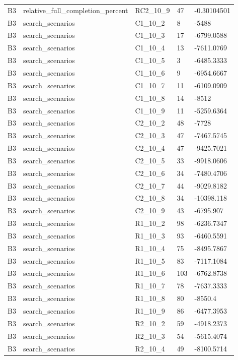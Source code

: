 \begin{longtable}{lllll}
B3 & relative\_full\_completion\_percent & RC2\_10\_9 & 47 & -0.30104501 \\
B3 & search\_scenarios & C1\_10\_2 & 8 & -5488 \\
B3 & search\_scenarios & C1\_10\_3 & 17 & -6799.0588 \\
B3 & search\_scenarios & C1\_10\_4 & 13 & -7611.0769 \\
B3 & search\_scenarios & C1\_10\_5 & 3 & -6485.3333 \\
B3 & search\_scenarios & C1\_10\_6 & 9 & -6954.6667 \\
B3 & search\_scenarios & C1\_10\_7 & 11 & -6109.0909 \\
B3 & search\_scenarios & C1\_10\_8 & 14 & -8512 \\
B3 & search\_scenarios & C1\_10\_9 & 11 & -5259.6364 \\
B3 & search\_scenarios & C2\_10\_2 & 48 & -7728 \\
B3 & search\_scenarios & C2\_10\_3 & 47 & -7467.5745 \\
B3 & search\_scenarios & C2\_10\_4 & 47 & -9425.7021 \\
B3 & search\_scenarios & C2\_10\_5 & 33 & -9918.0606 \\
B3 & search\_scenarios & C2\_10\_6 & 34 & -7480.4706 \\
B3 & search\_scenarios & C2\_10\_7 & 44 & -9029.8182 \\
B3 & search\_scenarios & C2\_10\_8 & 34 & -10398.118 \\
B3 & search\_scenarios & C2\_10\_9 & 43 & -6795.907 \\
B3 & search\_scenarios & R1\_10\_2 & 98 & -6236.7347 \\
B3 & search\_scenarios & R1\_10\_3 & 93 & -6460.5591 \\
B3 & search\_scenarios & R1\_10\_4 & 75 & -8495.7867 \\
B3 & search\_scenarios & R1\_10\_5 & 83 & -7117.1084 \\
B3 & search\_scenarios & R1\_10\_6 & 103 & -6762.8738 \\
B3 & search\_scenarios & R1\_10\_7 & 78 & -7637.3333 \\
B3 & search\_scenarios & R1\_10\_8 & 80 & -8550.4 \\
B3 & search\_scenarios & R1\_10\_9 & 86 & -6477.3953 \\
B3 & search\_scenarios & R2\_10\_2 & 59 & -4918.2373 \\
B3 & search\_scenarios & R2\_10\_3 & 54 & -5615.4074 \\
B3 & search\_scenarios & R2\_10\_4 & 49 & -8100.5714 \\

\end{longtable}
